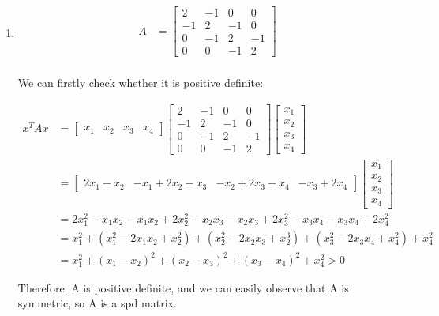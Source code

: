 \documentclass{article}
\begin{document}
\begin{enumerate}
\item
\begin{align*}
A &= \begin{bmatrix}
2&-1&0&0\\-1&2&-1&0\\0&-1&2&-1\\0&0&-1&2
\end{bmatrix}\\
\end{align*}

We can firstly check whether it is positive definite:

\begin{align*}
x^TAx&=\begin{bmatrix}
x_1&x_2&x_3&x_4
\end{bmatrix}\begin{bmatrix}
2&-1&0&0\\-1&2&-1&0\\0&-1&2&-1\\0&0&-1&2
\end{bmatrix}\begin{bmatrix}
x_1\\x_2\\x_3\\x_4
\end{bmatrix}\\
&=\begin{bmatrix}
2x_1-x_2&-x_1+2x_2-x_3&-x_2+2x_3-x_4&-x_3+2x_4
\end{bmatrix}\begin{bmatrix}
x_1\\x_2\\x_3\\x_4
\end{bmatrix}\\
&=2x_1^2-x_1x_2-x_1x_2+2x_2^2-x_2x_3-x_2x_3+2x_3^2-x_3x_4-x_3x_4+2x_4^2\\&=x_1^2+(x_1^2-2x_1x_2+x_2^2)+(x_2^2-2x_2x_3+x_2^3)+(x_3^2-2x_3x_4+x_4^2)+x_4^2\\
&=x_1^2+(x_1-x_2)^2+(x_2-x_3)^2+(x_3-x_4)^2+x_4^2>0
\end{align*}

Therefore, A is positive definite, and we can easily observe that A is symmetric, so A is a spd matrix.


\end{enumerate}
\end{document}
